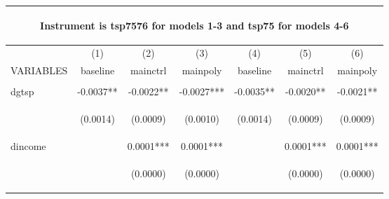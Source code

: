 \begin{center}
\begin{tabular}{lcccccc}
\multicolumn{7}{c}{\begin{large}Instrument is tsp7576 for models 1-3 and tsp75 for models 4-6\end{large}} \\ \hline
 & (1) & (2) & (3) & (4) & (5) & (6) \\
VARIABLES & baseline & mainctrl & mainpoly & baseline & mainctrl & mainpoly \\ \hline
\vspace{4pt} & \begin{footnotesize}\end{footnotesize} & \begin{footnotesize}\end{footnotesize} & \begin{footnotesize}\end{footnotesize} & \begin{footnotesize}\end{footnotesize} & \begin{footnotesize}\end{footnotesize} & \begin{footnotesize}\end{footnotesize} \\
dgtsp & -0.0037** & -0.0022** & -0.0027*** & -0.0035** & -0.0020** & -0.0021** \\
\vspace{4pt} & \begin{footnotesize}(0.0014)\end{footnotesize} & \begin{footnotesize}(0.0009)\end{footnotesize} & \begin{footnotesize}(0.0010)\end{footnotesize} & \begin{footnotesize}(0.0014)\end{footnotesize} & \begin{footnotesize}(0.0009)\end{footnotesize} & \begin{footnotesize}(0.0009)\end{footnotesize} \\
dincome &  & 0.0001*** & 0.0001*** &  & 0.0001*** & 0.0001*** \\
\vspace{4pt} & \begin{footnotesize}\end{footnotesize} & \begin{footnotesize}(0.0000)\end{footnotesize} & \begin{footnotesize}(0.0000)\end{footnotesize} & \begin{footnotesize}\end{footnotesize} & \begin{footnotesize}(0.0000)\end{footnotesize} & \begin{footnotesize}(0.0000)\end{footnotesize} \\

\end{tabular}
\end{center}
